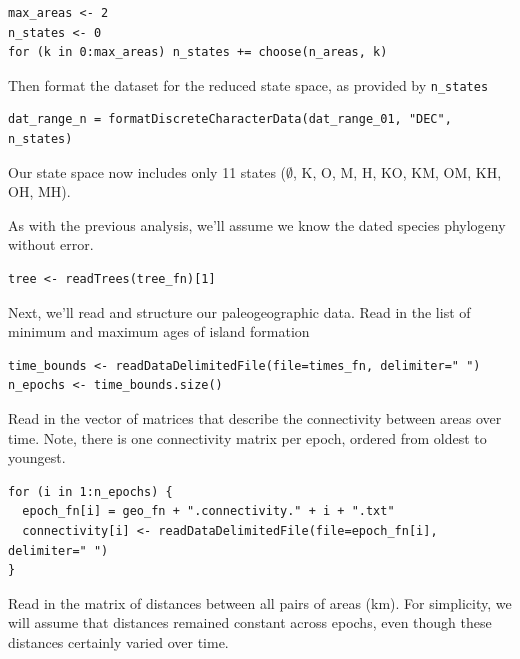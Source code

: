 \begin{snugshade}
\begin{lstlisting}
max_areas <- 2
n_states <- 0
for (k in 0:max_areas) n_states += choose(n_areas, k)
\end{lstlisting}
\end{snugshade}

Then format the dataset for the reduced state space, as provided by {\tt n\_states}

\begin{snugshade}
\begin{lstlisting}
dat_range_n = formatDiscreteCharacterData(dat_range_01, "DEC", n_states)
\end{lstlisting}
\end{snugshade}

Our state space now includes only 11 states ($\emptyset$, K, O, M, H, KO, KM, OM, KH, OH, MH).

As with the previous analysis, we'll assume we know the dated species phylogeny without error.

\begin{snugshade}
\begin{lstlisting}
tree <- readTrees(tree_fn)[1]
\end{lstlisting}
\end{snugshade}

Next, we'll read and structure our paleogeographic data.
Read in the list of minimum and maximum ages of island formation

\begin{snugshade}
\begin{lstlisting}
time_bounds <- readDataDelimitedFile(file=times_fn, delimiter=" ")
n_epochs <- time_bounds.size()
\end{lstlisting}
\end{snugshade}

Read in the vector of matrices that describe the connectivity between areas over time.
Note, there is one connectivity matrix per epoch, ordered from oldest to youngest.

\begin{snugshade}
\begin{lstlisting}
for (i in 1:n_epochs) {
  epoch_fn[i] = geo_fn + ".connectivity." + i + ".txt"
  connectivity[i] <- readDataDelimitedFile(file=epoch_fn[i], delimiter=" ")
}
\end{lstlisting}
\end{snugshade}

Read in the matrix of distances between all pairs of areas (km).
For simplicity, we will assume that distances remained constant across epochs, even though these distances certainly varied over time.


